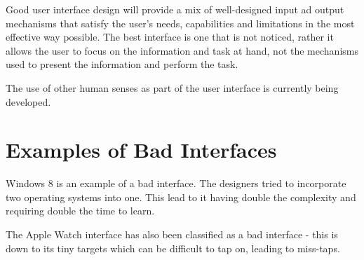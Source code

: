 Good user interface design will provide a mix of well-designed input ad output mechanisms that satisfy the user's needs, capabilities and limitations in the most effective way possible. The best interface is one that is not noticed, rather it allows the user to focus on the information and task at hand, not the mechanisms used to present the information and perform the task.

The use of other human senses as part of the user interface is currently being developed. 

\section*{Examples of Bad Interfaces}
Windows 8 is an example of a bad interface. The designers tried to incorporate two operating systems into one. This lead to it having double the complexity and requiring double the time to learn. 

The Apple Watch interface has also been classified as a bad interface - this is down to its tiny targets which can be difficult to tap on, leading to miss-taps. 